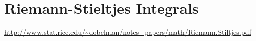 \section{Riemann-Stieltjes Integrals}
\url{http://www.stat.rice.edu/~dobelman/notes_papers/math/Riemann.Stiltjes.pdf}
